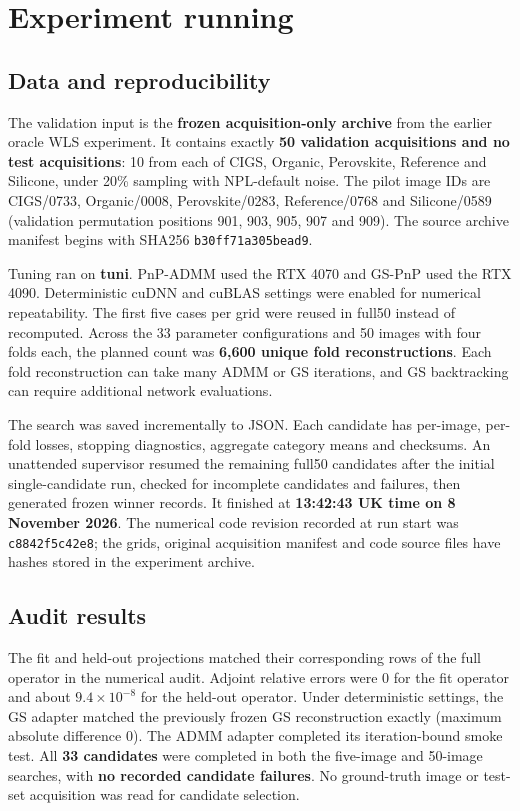 \documentclass[a4paper,10pt]{article}
\begin{document}
\section{Experiment running}

\subsection*{Data and reproducibility}

The validation input is the \textbf{frozen acquisition-only archive} from the earlier oracle WLS experiment. It contains exactly \textbf{50 validation acquisitions and no test acquisitions}: 10 from each of CIGS, Organic, Perovskite, Reference and Silicone, under 20\% sampling with NPL-default noise. The pilot image IDs are CIGS/0733, Organic/0008, Perovskite/0283, Reference/0768 and Silicone/0589 (validation permutation positions 901, 903, 905, 907 and 909). The source archive manifest begins with SHA256 \texttt{b30ff71a305bead9}.

Tuning ran on \textbf{tuni}. PnP-ADMM used the RTX 4070 and GS-PnP used the RTX 4090. Deterministic cuDNN and cuBLAS settings were enabled for numerical repeatability. The first five cases per grid were reused in full50 instead of recomputed. Across the 33 parameter configurations and 50 images with four folds each, the planned count was \textbf{6,600 unique fold reconstructions}. Each fold reconstruction can take many ADMM or GS iterations, and GS backtracking can require additional network evaluations.

The search was saved incrementally to JSON. Each candidate has per-image, per-fold losses, stopping diagnostics, aggregate category means and checksums. An unattended supervisor resumed the remaining full50 candidates after the initial single-candidate run, checked for incomplete candidates and failures, then generated frozen winner records. It finished at \textbf{13:42:43 UK time on 8 November 2026}. The numerical code revision recorded at run start was \texttt{c8842f5c42e8}; the grids, original acquisition manifest and code source files have hashes stored in the experiment archive.

\subsection*{Audit results}

The fit and held-out projections matched their corresponding rows of the full operator in the numerical audit. Adjoint relative errors were 0 for the fit operator and about $9.4\times10^{-8}$ for the held-out operator. Under deterministic settings, the GS adapter matched the previously frozen GS reconstruction exactly (maximum absolute difference 0). The ADMM adapter completed its iteration-bound smoke test. All \textbf{33 candidates} were completed in both the five-image and 50-image searches, with \textbf{no recorded candidate failures}. No ground-truth image or test-set acquisition was read for candidate selection.
\end{document}
